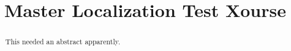 \documentclass{xourse}
\title{Master Localization Test Xourse}
\begin{document}
\begin{abstract}
This needed an abstract apparently.
\end{abstract}
\maketitle

\end{document}
